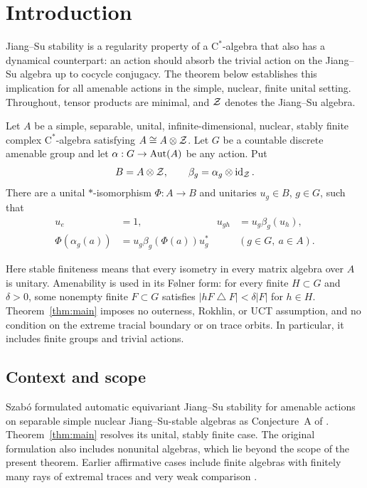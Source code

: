 \section{Introduction}

Jiang--Su stability is a regularity property of a \(\mathrm C^*\)-algebra
that also has a dynamical counterpart: an action should absorb the
trivial action on the Jiang--Su algebra up to cocycle conjugacy.
The theorem below establishes this implication for all amenable actions
in the simple, nuclear, finite unital setting. Throughout, tensor products
are minimal, and \(\mathcal Z\) denotes the Jiang--Su algebra.

\begin{theorem}\label{thm:main}
Let \(A\) be a simple, separable, unital, infinite-dimensional, nuclear,
stably finite complex \(\mathrm C^*\)-algebra satisfying
\(A\cong A\otimes\mathcal Z\). Let \(G\) be a countable discrete amenable group
and let \(\alpha:G\to\operatorname{Aut}(A)\) be any action. Put
\[
 B=A\otimes\mathcal Z,\qquad
 \beta_g=\alpha_g\otimes\operatorname{id}_{\mathcal Z}.
\]
There are a unital \(*\)-isomorphism \(\Phi:A\to B\) and unitaries
\(u_g\in B\), \(g\in G\), such that
\begin{align}
 u_e&=1,& u_{gh}&=u_g\beta_g(u_h),\label{eq:cocycle}\\
 \Phi(\alpha_g(a))&=u_g\beta_g(\Phi(a))u_g^*
 &&(g\in G,\ a\in A).\label{eq:conjugacy}
\end{align}
\end{theorem}

Here stable finiteness means that every isometry in every matrix algebra
over \(A\) is unitary. Amenability is used in its F{\o}lner form: for
every finite \(H\subset G\) and \(\delta>0\), some nonempty finite
\(F\subset G\) satisfies
\(\lvert hF\mathbin{\triangle}F\rvert<\delta\lvert F\rvert\) for \(h\in H\).
Theorem~\ref{thm:main} imposes no outerness, Rokhlin, or UCT assumption,
and no condition on the extreme tracial boundary or on trace orbits.
In particular, it includes finite groups and trivial actions.

\subsection{Context and scope}

Szab\'o formulated automatic equivariant Jiang--Su stability for
amenable actions on separable simple nuclear Jiang--Su-stable algebras
as Conjecture~A of \cite{SzaboSI2021}.
Theorem~\ref{thm:main} resolves its unital, stably finite case.
The original formulation also includes nonunital algebras, which lie
beyond the scope of the present theorem. Earlier affirmative cases
include finite algebras with finitely many rays of extremal traces
and very weak comparison \cite[Theorem~C]{SzaboSI2021}.

